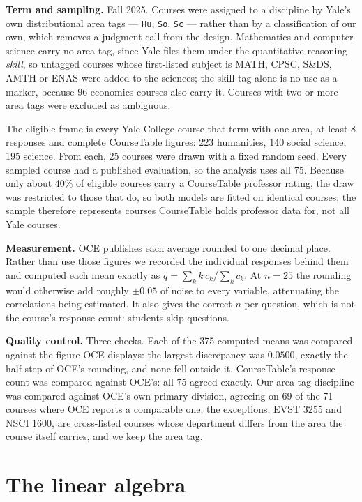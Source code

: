 \documentclass[11pt]{article}
\begin{document}
\textbf{Term and sampling.} Fall 2025. Courses were assigned to a discipline by
Yale's own distributional area tags --- \texttt{Hu}, \texttt{So}, \texttt{Sc}
--- rather than by a classification of our own, which removes a judgment call
from the design. Mathematics and computer science carry no area tag, since Yale
files them under the quantitative-reasoning \emph{skill}, so untagged courses
whose first-listed subject is MATH, CPSC, S\&DS, AMTH or ENAS were added to the
sciences; the skill tag alone is no use as a marker, because 96 economics
courses also carry it. Courses with two or more area tags were excluded as
ambiguous.

The eligible frame is every Yale College course that term with one area, at
least 8 responses and complete CourseTable figures: 223 humanities, 140 social
science, 195 science. From each, 25 courses were drawn with a fixed random seed.
Every sampled course had a published evaluation, so the analysis uses all 75.
Because only about 40\% of eligible courses carry a CourseTable professor
rating, the draw was restricted to those that do, so both models are fitted on
identical courses; the sample therefore represents courses CourseTable holds
professor data for, not all Yale courses.

\textbf{Measurement.} OCE publishes each average rounded to one decimal place.
Rather than use those figures we recorded the individual responses behind them
and computed each mean exactly as $\bar q = \sum_k k\,c_k / \sum_k c_k$. At
$n = 25$ the rounding would otherwise add roughly $\pm 0.05$ of noise to every
variable, attenuating the correlations being estimated. It also gives the
correct $n$ per question, which is not the course's response count: students
skip questions.

\textbf{Quality control.} Three checks. Each of the 375 computed means was
compared against the figure OCE displays: the largest discrepancy was $0.0500$,
exactly the half-step of OCE's rounding, and none fell outside it. CourseTable's
response count was compared against OCE's: all 75 agreed exactly. Our area-tag
discipline was compared against OCE's own primary division, agreeing on 69 of
the 71 courses where OCE reports a comparable one; the exceptions, EVST 3255 and
NSCI 1600, are cross-listed courses whose department differs from the area the
course itself carries, and we keep the area tag.

\section{The linear algebra}
\end{document}
